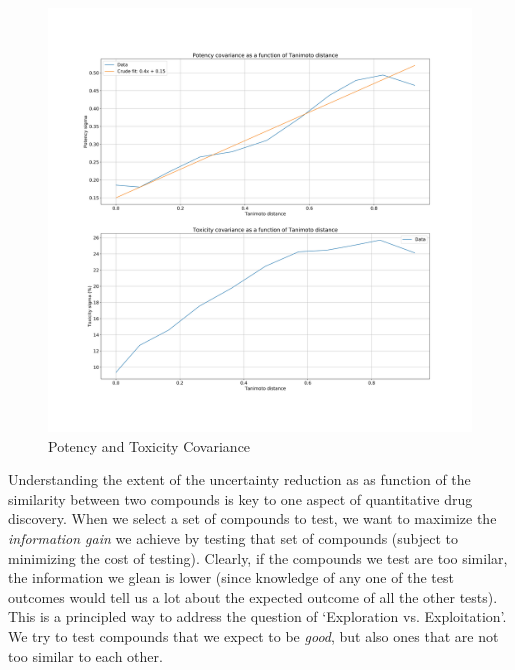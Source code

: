 \documentclass[journal=jacsat,manuscript=article]{achemso}
\begin{document}
\begin{figure}[h!]
\centering
\includegraphics[width=\textwidth]{fig3_covariance.jpg}
\caption{Potency and Toxicity Covariance}
\label{fig:cov}
\end{figure}
Understanding the extent of the uncertainty reduction as as function of the similarity between two compounds is key to one aspect of quantitative drug discovery.  When we select a set of compounds to test, we want to maximize the \textit{information gain} we achieve by testing that set of compounds (subject to minimizing the cost of testing).  Clearly, if the compounds we test are too similar, the information we glean is lower (since knowledge of any one of the test outcomes would tell us a lot about the expected outcome of all the other tests).  This is a principled way to address the question of `Exploration vs. Exploitation'.  We try to test compounds that we expect to be \textit{good}, but also ones that are not too similar to each other.
\end{document}

